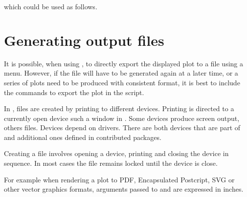 \documentclass[krantz2]{krantz}\usepackage{knitr}
\begin{document}
which could be used as follows.

\begin{knitrout}\footnotesize
{}\color{fgcolor}\begin{kframe}
\begin{alltt}
\hlstd{(} 
          \hlstd{(}   
           \hlstd{=}  \hlopt{+}
          \hlstd{()}
\end{alltt}
\end{kframe}
\end{knitrout}


\section{Generating output files}
It is possible, when using \RStudio, to directly export the displayed plot to a file using a menu. However, if the file will have to be generated again at a later time, or a series of plots need to be produced with consistent format, it is best to include the commands to export the plot in the script.

In \Rlang, files are created by printing to different devices. Printing is directed to a currently open device such a window in \RStudio. Some devices produce screen output, others files. Devices depend on drivers. There are both devices that are part of \Rlang and additional ones defined in contributed packages.

Creating a file involves opening a device, printing and closing the device in sequence. In most cases the file remains locked until the device is close.

For example when rendering a plot to PDF, Encapsulated Postcript, SVG or other vector graphics formats, arguments passed to  and  are expressed in inches.

\begin{knitrout}\footnotesize
{}\color{fgcolor}\begin{kframe}
\begin{alltt}
 \hlkwb{<-} \hlstd{(}\hlstd{(} \hlstd{=} \hlopt{-}\hlopt{:}\hlstd{),} \hlstd{(}  \hlopt{+}
  \hlstd{(} 
\hlstd{(} \hlstd{=} \hlstd{,}  \hlstd{=} \hlstd{,}  \hlstd{=} \hlstd{)}
\hlstd{()}
\end{alltt}
\end{kframe}
\end{knitrout}
\end{document}
